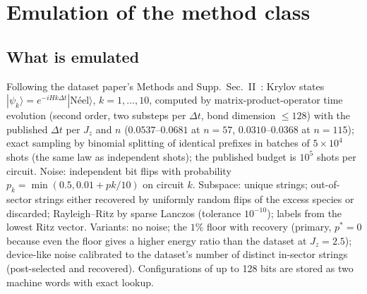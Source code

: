 \documentclass[aps,prx,onecolumn,10pt,nofootinbib,longbibliography,floatfix]{revtex4-2}
\theoremstyle{remark}
\newcommand{\Jz}{J_z}
\begin{document}
\section{Emulation of the method class}
\label{sm:emu}

\subsection{What is emulated}
Following the dataset paper's Methods and Supp.\ Sec.~II~\cite{jaderberg2026}: Krylov states %
$|\psi_k\rangle=e^{-iHk\Delta t}|\text{N\'eel}\rangle$, $k=1,\dots,10$, computed by matrix-product-operator time %
evolution (second order, two substeps per $\Delta t$, bond dimension $\le128$) with the published $\Delta t$ per $\Jz$ %
and $n$ ($0.0537$--$0.0681$ at $n=57$, $0.0310$--$0.0368$ at $n=115$); exact sampling by binomial splitting of %
identical prefixes in batches of $5\times10^4$ shots (the same law as independent shots); the published budget is %
$10^5$ shots per circuit. Noise: independent bit flips with probability $p_k=\min(0.5,0.01+pk/10)$ on circuit $k$. %
Subspace: unique strings; out-of-sector strings either recovered by uniformly random flips of the excess species or
discarded; Rayleigh--Ritz by sparse Lanczos (tolerance $10^{-10}$); labels from the lowest Ritz vector. Variants: %
no noise; the $1\%$ floor with recovery (primary, $p^*=0$ because even the floor gives a higher energy ratio than the %
dataset at $\Jz=2.5$); device-like noise calibrated to the dataset's number of distinct in-sector strings (post-selected %
and recovered). Configurations of up to 128 bits are stored as two machine words with exact lookup. %
\end{document}
